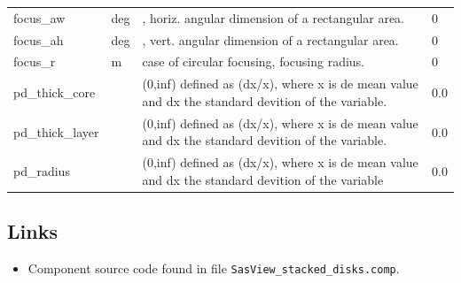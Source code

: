 \begin{longtable}{p{}p{}p{}p{}}
focus\_aw & deg & , horiz. angular dimension of a rectangular area. & 0 \\
focus\_ah & deg & , vert. angular dimension of a rectangular area. & 0 \\
focus\_r & m & case of circular focusing, focusing radius. & 0 \\
pd\_thick\_core &  & (0,inf) defined as (dx/x), where x is de mean value and dx the standard devition of the variable. & 0.0 \\
pd\_thick\_layer &  & (0,inf) defined as (dx/x), where x is de mean value and dx the standard devition of the variable. & 0.0 \\
pd\_radius &  & (0,inf) defined as (dx/x), where x is de mean value and dx the standard devition of the variable & 0.0 \\
\bottomrule
\end{longtable}

\subsection*{Links}
\begin{itemize}
  \item Component source code found in file \texttt{SasView\_stacked\_disks.comp}.
\end{itemize}
